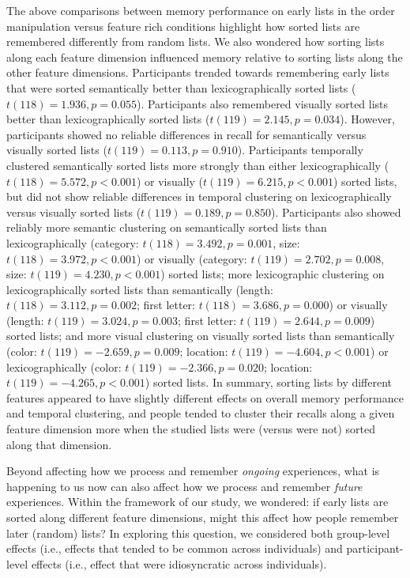 \documentclass[11pt]{article}
\begin{document}
The above comparisons between memory performance on early lists in the order
manipulation versus feature rich conditions highlight how sorted lists are
remembered differently from random lists. We also wondered how sorting lists
along each feature dimension influenced memory relative to sorting lists along
the other feature dimensions. Participants trended towards remembering early
lists that were sorted semantically better than lexicographically sorted lists
($t(118) = 1.936, p = 0.055$). Participants also remembered visually sorted
lists better than lexicographically sorted lists ($t(119) = 2.145, p = 0.034$).
However, participants showed no reliable differences in recall for semantically
versus visually sorted lists ($t(119) = 0.113, p = 0.910$). Participants
temporally clustered semantically sorted lists more strongly than either
lexicographically ($t(118) = 5.572, p < 0.001$) or visually ($t(119) = 6.215, p
< 0.001$) sorted lists, but did not show reliable differences in temporal
clustering on lexicographically versus visually sorted lists ($t(119) = 0.189,
p = 0.850$). Participants also showed reliably more semantic clustering on
semantically sorted lists than lexicographically (category: $t(118) = 3.492, p
= 0.001$, size: $t(118) = 3.972, p < 0.001$) or visually (category: $t(119) =
2.702, p = 0.008$, size: $t(119) = 4.230, p < 0.001$) sorted lists; more
lexicographic clustering on lexicographically sorted lists than semantically
(length: $t(118) = 3.112, p = 0.002$; first letter: $t(118) = 3.686, p =
0.000$) or visually (length: $t(119) = 3.024, p = 0.003$; first letter: $t(119)
= 2.644, p = 0.009$) sorted lists; and more visual clustering on visually
sorted lists than semantically (color: $t(119) = -2.659, p = 0.009$; location:
$t(119) = -4.604, p < 0.001$) or lexicographically (color: $t(119) = -2.366, p
= 0.020$; location: $t(119) = -4.265, p < 0.001$) sorted lists. In summary,
sorting lists by different features appeared to have slightly different effects
on overall memory performance and temporal clustering, and people tended to
cluster their recalls along a given feature dimension more when the studied
lists were (versus were not) sorted along that dimension.

Beyond affecting how we process and remember \textit{ongoing} experiences, what
is happening to us now can also affect how we process and remember
\textit{future} experiences. Within the framework of our study, we wondered: if
early lists are sorted along different feature dimensions, might this affect
how people remember later (random) lists? In exploring this question, we
considered both group-level effects (i.e., effects that tended to be common
across individuals) and participant-level effects (i.e., effect that were
idiosyncratic across individuals).
\end{document}
